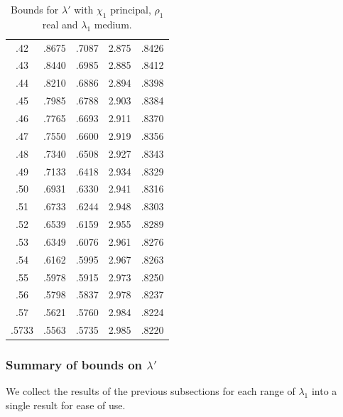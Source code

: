\documentclass[12pt,psamsfonts]{amsart}
\theoremstyle{definition}
\theoremstyle{remark}
\numberwithin{equation}{section}
\begin{document}
\begin{table}
\begin{tabular}{c|c|c|c|c}
 .42 &  .8675 &  .7087 &  2.875 &  .8426 \\ 
 .43 &  .8440 &  .6985 &  2.885 &  .8412 \\ 
 .44 &  .8210 &  .6886 &  2.894 &  .8398 \\ 
 .45 &  .7985 &  .6788 &  2.903 &  .8384 \\ 
 .46 &  .7765 &  .6693 &  2.911 &  .8370 \\ 
 .47 &  .7550 &  .6600 &  2.919 &  .8356 \\ 
 .48 &  .7340 &  .6508 &  2.927 &  .8343 \\ 
 .49 &  .7133 &  .6418 &  2.934 &  .8329 \\ 
 .50 &  .6931 &  .6330 &  2.941 &  .8316 \\ 
 .51 &  .6733 &  .6244 &  2.948 &  .8303 \\ 
 .52 &  .6539 &  .6159 &  2.955 &  .8289 \\ 
 .53 &  .6349 &  .6076 &  2.961 &  .8276 \\ 
 .54 &  .6162 &  .5995 &  2.967 &  .8263 \\ 
 .55 &  .5978 &  .5915 &  2.973 &  .8250 \\ 
 .56 &  .5798 &  .5837 &  2.978 &  .8237 \\ 
 .57 &  .5621 &  .5760 &  2.984 &  .8224 \\ 
 .5733 &  .5563 &  .5735 &  2.985 &  .8220 \\ 
\end{tabular}




\caption{Bounds for $\lambda'$ with $\chi_1$ principal, $\rho_1$ real and $\lambda_1$ medium.}
\label{Table-SZ-L1Lpmedium-Principal}
\end{table}



\subsubsection{Summary of bounds on $\lambda'$}
We collect the results of the previous subsections for each range of $\lambda_1$ into a single result for ease of use. 
\end{document}
